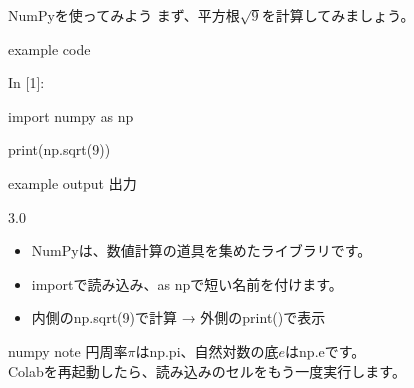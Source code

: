 \documentclass[12pt,aspectratio=43]{beamer}
\newcommand{\pythonexample}[4]{%
  \begin{beamercolorbox}[wd=\linewidth,sep=1.8mm]{example code}
    {\codefont\fontsize{9}{10}\selectfont\textcolor{courseblue}{In [#1]:}\par}
    \begingroup\codefont\fontsize{16}{18}\selectfont
      \strut#2\\
      \strut#3\par
    \endgroup
  \end{beamercolorbox}\par
  \begin{beamercolorbox}[wd=\linewidth,sep=.5mm,leftskip=1.3mm]{example output}
    {\fontsize{9}{11}\selectfont\textcolor{black!65}{出力}}\quad
    {\codefont\fontsize{16}{18}\selectfont\strut#4}
  \end{beamercolorbox}}
\begin{document}
\begin{frame}[t]{NumPyを使ってみよう}
  \setlength{\parskip}{0pt}
  まず、平方根$\sqrt{9}$を計算してみましょう。
  \par\vspace{1mm}
  \pythonexample{1}
    {\textcolor{codebuiltin}{import} numpy \textcolor{codebuiltin}{as} np}
    {\textcolor{codebuiltin}{print}(np.\textcolor{codebuiltin}{sqrt}(\textcolor{codevalue}{9}))}{3.0}
  \par\vspace{1mm}
  \begin{itemize}
    \setlength{\itemsep}{1mm}
    \item NumPyは、数値計算の道具を集めたライブラリです。
    \item {\codefont import}で読み込み、{\codefont as np}で短い名前を付けます。
    \item 内側の{\codefont np.sqrt(9)}で計算 → 外側の{\codefont print()}で表示
  \end{itemize}
  \vspace{1mm}
  \begin{beamercolorbox}[wd=\textwidth,sep=1.2mm]{numpy note}
    \small 円周率$\pi$は{\codefont np.pi}、自然対数の底$e$は{\codefont np.e}です。\\
    Colabを再起動したら、読み込みのセルをもう一度実行します。
  \end{beamercolorbox}
\end{frame}
\end{document}
